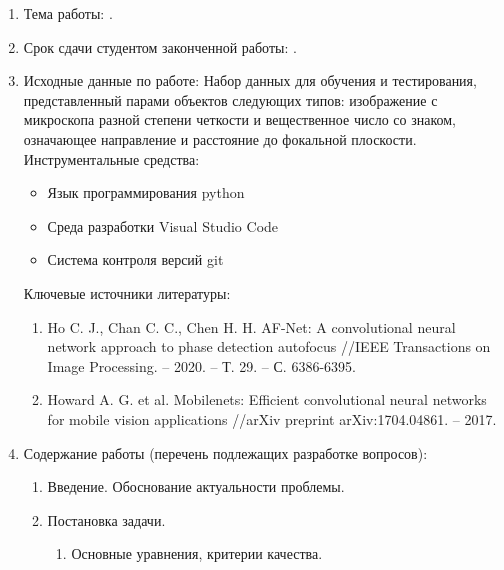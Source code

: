 \begin{enumerate}[1.]
	\item Тема работы: {\expandafter \thesisTitle.}
	\item Срок сдачи студентом законченной работы: \thesisDeadline. 
	\item Исходные данные по работе: Набор данных для обучения и тестирования, представленный парами объектов следующих типов: изображение с микроскопа разной степени четкости и вещественное число со знаком, означающее направление и расстояние до фокальной плоскости.\\%
	Инструментальные средства:
	\begin{itemize}
		\item Язык программирования python
		\item Среда разработки Visual Studio Code
		\item Система контроля версий git
	\end{itemize}
	Ключевые источники литературы:
	\begin{enumerate}
		\item Ho C. J., Chan C. C., Chen H. H. AF-Net: A convolutional neural network approach to phase detection autofocus //IEEE Transactions on Image Processing. – 2020. – Т. 29. – С. 6386-6395.
		\item Howard A. G. et al. Mobilenets: Efficient convolutional neural networks for mobile vision applications //arXiv preprint arXiv:1704.04861. – 2017.
	\end{enumerate}
	\item Содержание работы (перечень подлежащих разработке вопросов):
	\begin{enumerate}[label=\theenumi\arabic*.]
		\item Введение. Обоснование актуальности проблемы.
		\item Постановка задачи.
		\begin{enumerate}[label=\theenumii\arabic*.]
			\item Основные уравнения, критерии качества.

\end{enumerate}
\end{enumerate}
\end{enumerate}

